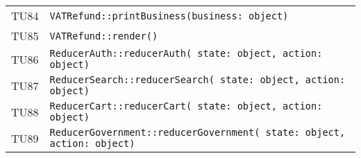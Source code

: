 \begin{longtable}{ >{\centering}p{} >{}p{}}
			\hypertarget{TU84}{TU84} & 
			\texttt{VATRefund::printBusiness(business: object)}\\

			\hypertarget{TU85}{TU85} & 
			\texttt{VATRefund::render()}\\
			
			\hypertarget{TU86}{TU86} & 
			\texttt{ReducerAuth::reducerAuth( state: object, action: object)}\\
			
			\hypertarget{TU87}{TU87} & 
			\texttt{ReducerSearch::reducerSearch( state: object, action: 
			object)}\\
		
			\hypertarget{TU88}{TU88} & 
			\texttt{ReducerCart::reducerCart( state: object, action: object)}\\
			
			\hypertarget{TU89}{TU89} & 
			\texttt{ReducerGovernment::reducerGovernment( state: object, 
			action: object)}\\

		\end{longtable}
